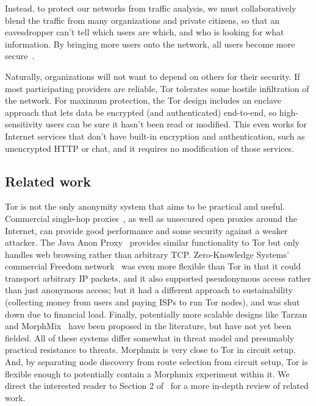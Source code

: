 \documentclass{llncs}
\begin{document}
Instead, to protect our networks from traffic analysis, we must
collaboratively blend the traffic from many organizations and private
citizens, so that an eavesdropper can't tell which users are which,
and who is looking for what information.  By bringing more users onto
the network, all users become more secure~\cite{econymics}.

Naturally, organizations will not want to depend on others for their
security.  If most participating providers are reliable, Tor tolerates
some hostile infiltration of the network.  For maximum protection,
the Tor design includes an enclave approach that lets data be encrypted
(and authenticated) end-to-end, so high-sensitivity users can be sure it
hasn't been read or modified.  This even works for Internet services that
don't have built-in encryption and authentication, such as unencrypted
HTTP or chat, and it requires no modification of those services.


\subsection{Related work}
Tor is not the only anonymity system that aims to be practical and useful.
Commercial single-hop proxies~\cite{anonymizer}, as well as unsecured
open proxies around the Internet, can provide good
performance and some security against a weaker attacker. The Java
Anon Proxy~\cite{web-mix} provides similar functionality to Tor but only
handles web browsing rather than arbitrary TCP\@.
Zero-Knowledge Systems' commercial Freedom
network~\cite{freedom21-security} was even more flexible than Tor in
that it could transport arbitrary IP packets, and it also supported
pseudonymous access rather than just anonymous access; but it had
a different approach to sustainability (collecting money from users
and paying ISPs to run Tor nodes), and was shut down due to financial
load.  Finally, potentially
more scalable designs like Tarzan~\cite{tarzan:ccs02} and
MorphMix~\cite{morphmix:fc04} have been proposed in the literature, but
have not yet been fielded. All of these systems differ somewhat
in threat model and presumably practical resistance to threats.
Morphmix is very close to Tor in circuit setup. And, by separating
node discovery from route selection from circuit setup, Tor is
flexible enough to potentially contain a Morphmix experiment within
it. We direct the interested reader to Section
2 of~\cite{tor-design} for a more in-depth review of related work.
\end{document}
